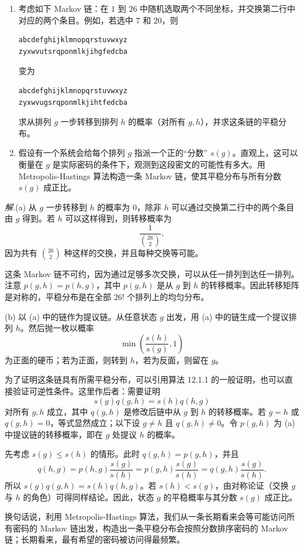 \documentclass[UTF8, 12pt, fontset=fandol, oneside]{ctexart}
\begin{document}
\begin{enumerate}
  \item[(a)] 考虑如下 Markov 链：在 $1$ 到 $26$ 中随机选取两个不同坐标，并交换第二行中对应的两个条目。例如，若选中 $7$ 和 $20$，则
\begin{verbatim}
abcdefghijklmnopqrstuvwxyz
zyxwvutsrqponmlkjihgfedcba
\end{verbatim}
变为
\begin{verbatim}
abcdefghijklmnopqrstuvwxyz
zyxwvugsrqponmlkjihtfedcba
\end{verbatim}
求从排列 $g$ 一步转移到排列 $h$ 的概率（对所有 $g,h$），并求这条链的平稳分布。

  \item[(b)] 假设有一个系统会给每个排列 $g$ 指派一个正的“分数” $s(g)$。直观上，这可以衡量在 $g$ 是实际密码的条件下，观测到这段密文的可能性有多大。用 Metropolis-Hastings 算法构造一条 Markov 链，使其平稳分布与所有分数 $s(g)$ 成正比。
\end{enumerate}

\noindent\textit{解.}\quad (a) 从 $g$ 一步转移到 $h$ 的概率为 $0$，除非 $h$ 可以通过交换第二行中的两个条目由 $g$ 得到。若 $h$ 可以这样得到，则转移概率为
\[
  \frac{1}{\binom{26}{2}},
\]
因为共有 $\binom{26}{2}$ 种这样的交换，并且每种交换等可能。

这条 Markov 链不可约，因为通过足够多次交换，可以从任一排列到达任一排列。注意 $p(g,h)=p(h,g)$，其中 $p(g,h)$ 是从 $g$ 到 $h$ 的转移概率。因此转移矩阵是对称的，平稳分布是在全部 $26!$ 个排列上的均匀分布。

(b) 以 (a) 中的链作为提议链。从任意状态 $g$ 出发，用 (a) 中的链生成一个提议排列 $h$。然后抛一枚以概率
\[
  \min\left(\frac{s(h)}{s(g)},1\right)
\]
为正面的硬币；若为正面，则转到 $h$，若为反面，则留在 $g$。

为了证明这条链具有所需平稳分布，可以引用算法 12.1.1 的一般证明，也可以直接验证可逆性条件。这里作后者：需要证明
\[
  s(g)q(g,h)=s(h)q(h,g)
\]
对所有 $g,h$ 成立，其中 $q(g,h)$ 是修改后链中从 $g$ 到 $h$ 的转移概率。若 $g=h$ 或 $q(g,h)=0$，等式显然成立；以下设 $g\ne h$ 且 $q(g,h)\ne0$。令 $p(g,h)$ 为 (a) 中提议链的转移概率，即在 $g$ 处提议 $h$ 的概率。

先考虑 $s(g)\le s(h)$ 的情形。此时 $q(g,h)=p(g,h)$，并且
\[
  q(h,g)=p(h,g)\frac{s(g)}{s(h)}
  =p(g,h)\frac{s(g)}{s(h)}
  =q(g,h)\frac{s(g)}{s(h)}.
\]
所以 $s(g)q(g,h)=s(h)q(h,g)$。若 $s(h)<s(g)$，由对称论证（交换 $g$ 与 $h$ 的角色）可得同样结论。因此，状态 $g$ 的平稳概率与其分数 $s(g)$ 成正比。

换句话说，利用 Metropolis-Hastings 算法，我们从一条长期看来会等可能访问所有密码的 Markov 链出发，构造出一条平稳分布会按照分数排序密码的 Markov 链；长期看来，最有希望的密码被访问得最频繁。
\end{document}
